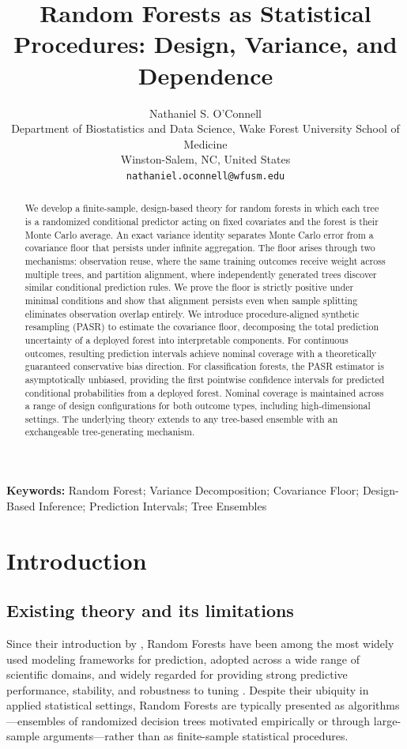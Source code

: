 \documentclass[11pt]{article}
\title{Random Forests as Statistical Procedures: Design, Variance, and Dependence}
\author{Nathaniel S. O'Connell\\
	Department of Biostatistics and Data Science, Wake Forest University School of Medicine\\
	Winston-Salem, NC, United States\\
	\texttt{nathaniel.oconnell@wfusm.edu}}
\date{} %
\theoremstyle{plain}
\theoremstyle{definition}
\theoremstyle{remark}
\begin{document}
	
	\maketitle
	
\begin{abstract}
	We develop a finite-sample, design-based theory for random forests in which each tree is a randomized conditional predictor acting on fixed covariates and the forest is their Monte Carlo average. An exact variance identity separates Monte Carlo error from a covariance floor that persists under infinite aggregation. The floor arises through two mechanisms: observation reuse, where the same training outcomes receive weight across multiple trees, and partition alignment, where independently generated trees discover similar conditional prediction rules. We prove the floor is strictly positive under minimal conditions and show that alignment persists even when sample splitting eliminates observation overlap entirely. We introduce procedure-aligned synthetic resampling (PASR) to estimate the covariance floor, decomposing the total prediction uncertainty of a deployed forest into interpretable components. For continuous outcomes, resulting prediction intervals achieve nominal coverage with a theoretically guaranteed conservative bias direction. For classification forests, the PASR estimator is asymptotically unbiased, providing the first pointwise confidence intervals for predicted conditional probabilities from a deployed forest. Nominal coverage is maintained across a range of design configurations for both outcome types, including high-dimensional settings. The underlying theory extends to any tree-based ensemble with an exchangeable tree-generating mechanism.
\end{abstract}
	
	\noindent\textbf{Keywords:} Random Forest; Variance Decomposition; Covariance Floor; Design-Based Inference; Prediction Intervals; Tree Ensembles
	
\section{Introduction}
\label{sec:intro}
\subsection{Existing theory and its limitations}

Since their introduction by \citet{breiman2001}, Random Forests have been among the most widely used modeling frameworks for prediction, adopted across a wide range of scientific domains, and widely regarded for providing strong predictive performance, stability, and robustness to tuning \citep{hastie2009}. Despite their ubiquity in applied statistical settings, Random Forests are typically presented as algorithms---ensembles of randomized decision trees motivated empirically or through large-sample arguments---rather than as finite-sample statistical procedures.
\end{document}

